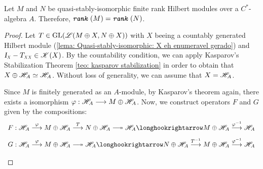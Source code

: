 \begin{teorema}\label{teo: M N quasi stably iso ==> rank igual}
Let $M$ and $N$ be quasi-stably-isomorphic finite rank Hilbert modules over a $C^*$-algebra $A$. Therefore, $\texttt{\textit{rank}}\,(M) = \texttt{\textit{rank}}\,(N)$.
\begin{proof}
Let $T \in \operatorname{GL}(\mathscr L(M\oplus X, N\oplus X))$ with $X$ beeing a countably generated Hilbert module (\ref{lema: Quasi-stably-isomorphic: X eh enumeravel gerado}) and $\sub \Id X - \sub T{XX} \in \mathscr K(X)$. By the countability condition, we can apply Kasparov's Stabilization Theorem \ref{teo: kasparov stabilization} in order to obtain that $X \oplus \mathscr H_A \simeq \mathscr H_A$. Without loss of generality, we can assume that $X = \mathscr H_A$.

Since $M$ is finitely generated as an $A$-module, by Kasparov's theorem again, there exists a isomorphism $\varphi :\mathscr H_A \longrightarrow M\oplus \mathscr H_A$. Now, we construct operators $F$ and $G$ given by the compositions:
\begin{equation*}
    \begin{array}{c}
         F: \HA \overset{\varphi}{\longto} M\oplus \HA \overset{T}{\longto} N\oplus \HA \longtwoheadrightarrow \HA \longhookrightarrow M\oplus \HA \overset{\inv \varphi}{\longto} {\HA}\\
    \vphantom{\displaystyle\int\limits^b}G: \HA \overset{\varphi}{\longto} M\oplus \HA \longtwoheadrightarrow \HA \longhookrightarrow N \oplus \HA \overset{\inv T}{\longto} M\oplus \HA \overset{\inv \varphi}{\longto} {\HA} 
    \end{array}
\end{equation*}


\end{proof}
\end{teorema}
